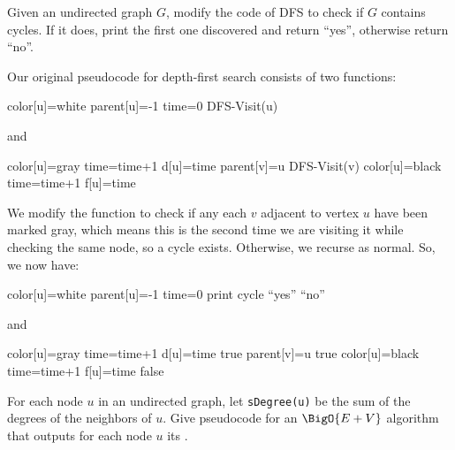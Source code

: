 \documentclass[12pt,letterpaper]{hmcpset}
\begin{document}
\problemlist{}

\begin{problem}[1]
Given an undirected graph $G$, modify the code of DFS to check if $G$ contains cycles.  If it does, print the first one discovered and return ``yes'', otherwise return ``no''.
\end{problem}

\begin{solution}
Our original pseudocode for depth-first search consists of two functions:
\begin{algorithmic}
	\State color[u]=white
	\State parent[u]=-1
	\State time=0
\EndFor
{}
\State DFS-Visit(u)
\EndIf
\EndFor
\EndFunction
\end{algorithmic}
and

\begin{algorithmic}
\State color[u]=gray
\State time=time+1
\State d[u]=time
\State parent[v]=u
\State DFS-Visit(v)
\EndIf
\EndFor
\State color[u]=black
\State time=time+1
\State f[u]=time
\EndFunction
\end{algorithmic}

We modify the  function to check if any each $v$ adjacent to vertex $u$ have been marked gray, which means this is the second time we are visiting it while checking the same node, so a cycle exists.  Otherwise, we recurse as normal.
So, we now have:
\begin{algorithmic}
	\State color[u]=white
	\State parent[u]=-1
	\State time=0
\EndFor
{}
\State print cycle
\State \Return ``yes''
\EndIf
\EndIf
\EndFor
\State \Return ``no''
\EndFunction
\end{algorithmic}
and

\begin{algorithmic}
\State color[u]=gray
\State time=time+1
\State d[u]=time
\State \Return true
\State parent[v]=u
\State \Return true
\EndIf
\EndIf
\EndFor
\State color[u]=black
\State time=time+1
\State f[u]=time
\State \Return false
\EndFunction
\end{algorithmic}
\end{solution}

\begin{problem}[2]
For each node $u$ in an undirected graph, let \verb|sDegree(u)| be the sum of the degrees of the neighbors of $u$.  Give pseudocode for an $\BigO{E+V}$ algorithm that outputs for each node $u$ its .
\end{problem}
\end{document}
